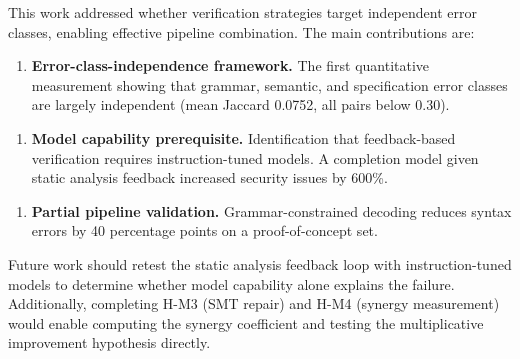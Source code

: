 
This work addressed whether verification strategies target independent error classes, enabling effective pipeline combination. The main contributions are:

\begin{enumerate}
\item \textbf{Error-class-independence framework.} The first quantitative measurement showing that grammar, semantic, and specification error classes are largely independent (mean Jaccard 0.0752, all pairs below 0.30).
\end{enumerate}

\begin{enumerate}
\item \textbf{Model capability prerequisite.} Identification that feedback-based verification requires instruction-tuned models. A completion model given static analysis feedback increased security issues by 600\%.
\end{enumerate}

\begin{enumerate}
\item \textbf{Partial pipeline validation.} Grammar-constrained decoding reduces syntax errors by 40 percentage points on a proof-of-concept set.
\end{enumerate}

Future work should retest the static analysis feedback loop with instruction-tuned models to determine whether model capability alone explains the failure. Additionally, completing H-M3 (SMT repair) and H-M4 (synergy measurement) would enable computing the synergy coefficient and testing the multiplicative improvement hypothesis directly.
